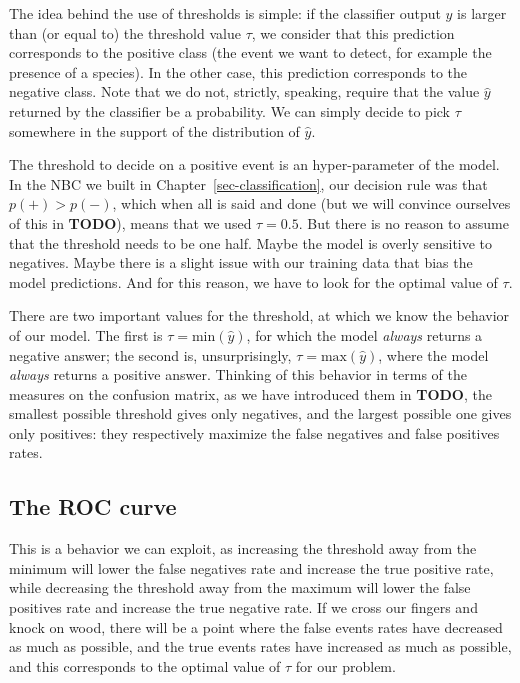 \documentclass[
  letterpaper,
]{scrbook}
\begin{document}

The idea behind the use of thresholds is simple: if the classifier
output \(\hat y\) is larger than (or equal to) the threshold value
\(\tau\), we consider that this prediction corresponds to the positive
class (the event we want to detect, for example the presence of a
species). In the other case, this prediction corresponds to the negative
class. Note that we do not, strictly, speaking, require that the value
\(\hat y\) returned by the classifier be a probability. We can simply
decide to pick \(\tau\) somewhere in the support of the distribution of
\(\hat y\).

The threshold to decide on a positive event is an hyper-parameter of the
model. In the NBC we built in Chapter~\ref{sec-classification}, our
decision rule was that \(p(+) > p(-)\), which when all is said and done
(but we will convince ourselves of this in \textbf{TODO}), means that we
used \(\tau = 0.5\). But there is no reason to assume that the threshold
needs to be one half. Maybe the model is overly sensitive to negatives.
Maybe there is a slight issue with our training data that bias the model
predictions. And for this reason, we have to look for the optimal value
of \(\tau\).

There are two important values for the threshold, at which we know the
behavior of our model. The first is \(\tau = \text{min}(\hat y)\), for
which the model \emph{always} returns a negative answer; the second is,
unsurprisingly, \(\tau = \text{max}(\hat y)\), where the model
\emph{always} returns a positive answer. Thinking of this behavior in
terms of the measures on the confusion matrix, as we have introduced
them in \textbf{TODO}, the smallest possible threshold gives only
negatives, and the largest possible one gives only positives: they
respectively maximize the false negatives and false positives rates.

\subsection{The ROC curve}\label{the-roc-curve}

This is a behavior we can exploit, as increasing the threshold away from
the minimum will lower the false negatives rate and increase the true
positive rate, while decreasing the threshold away from the maximum will
lower the false positives rate and increase the true negative rate. If
we cross our fingers and knock on wood, there will be a point where the
false events rates have decreased as much as possible, and the true
events rates have increased as much as possible, and this corresponds to
the optimal value of \(\tau\) for our problem.
\end{document}
